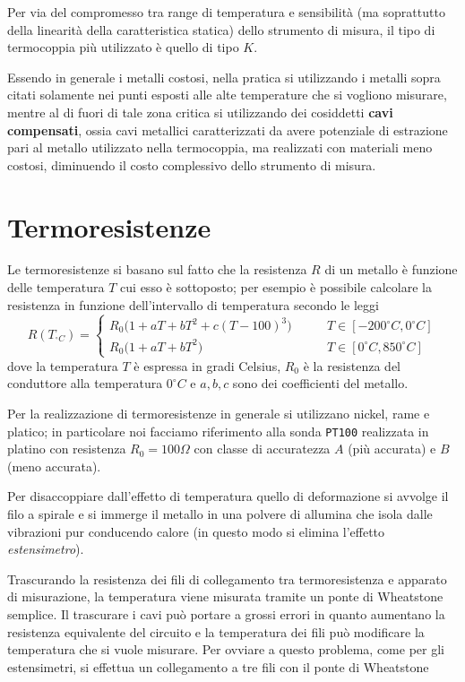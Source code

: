 		Per via del compromesso tra range di temperatura e sensibilità (ma soprattutto della linearità della caratteristica statica) dello strumento di misura, il tipo di termocoppia più utilizzato è quello di tipo $K$.
		
		\vspace{3mm}
		
		Essendo in generale i metalli costosi, nella pratica si utilizzando i metalli sopra citati solamente nei punti esposti alle alte temperature che si vogliono misurare, mentre al di fuori di tale zona critica si utilizzando dei cosiddetti \textbf{cavi compensati}, ossia cavi metallici caratterizzati da avere potenziale di estrazione pari al metallo utilizzato nella termocoppia, ma realizzati con materiali meno costosi, diminuendo il costo complessivo dello strumento di misura.
		
	
\section{Termoresistenze}
	Le termoresistenze si basano sul fatto che la resistenza $R$ di un metallo è funzione delle temperatura $T$ cui esso è sottoposto; per esempio è possibile calcolare la resistenza in funzione dell'intervallo di temperatura secondo le leggi
	\[ R(T_{^\circ C}) = \begin{cases}
		R_0\big(1 + aT + bT^2 + c(T-100)^3\big) \qquad & T\in [-200^\circ C, 0^\circ C] \\
		R_0\big(1 + aT + bT^2\big) \qquad &T\in [0^\circ C,850^\circ C] 
	\end{cases}\]
	dove la temperatura $T$ è espressa in gradi Celsius, $R_0$ è la resistenza del conduttore alla temperatura $0^\circ C$ e $a,b,c$ sono dei coefficienti del metallo.
	
	Per la realizzazione di termoresistenze in generale si utilizzano nickel, rame e platico; in particolare noi facciamo riferimento alla sonda \texttt{PT100} realizzata in platino con resistenza $R_0 = 100 \Omega$ con classe di accuratezza $A$ (più accurata) e $B$ (meno accurata).
	
	Per disaccoppiare dall'effetto di temperatura quello di deformazione si avvolge il filo a spirale e si immerge il metallo in una polvere di allumina che isola dalle vibrazioni pur conducendo calore (in questo modo si elimina l'effetto \textit{estensimetro}).
	
	Trascurando la resistenza dei fili di collegamento tra termoresistenza e apparato di misurazione, la temperatura viene misurata tramite un ponte di Wheatstone semplice. Il trascurare i cavi può portare a grossi errori in quanto aumentano la resistenza equivalente del circuito e la temperatura dei fili può modificare la temperatura che si vuole misurare. Per ovviare a questo problema, come per gli estensimetri, si effettua un collegamento a tre fili con il ponte di Wheatstone
	
